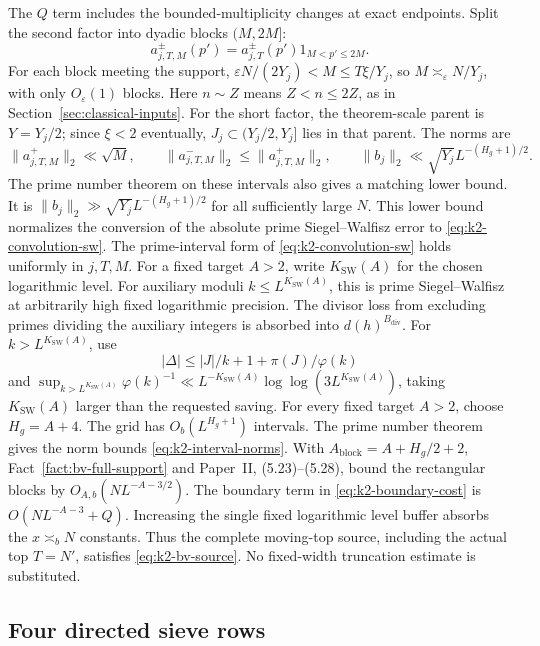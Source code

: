 The \(Q\) term includes the bounded-multiplicity changes at exact
endpoints. Split the second factor into dyadic blocks \((M,2M]\):
\[
 a_{j,T,M}^{\pm}(p')=a_{j,T}^{\pm}(p')1_{M<p'\le2M}.
\]
For each block meeting the support,
\(\varepsilon N/(2Y_j)<M\le T\xi/Y_j\), so
\(M\asymp_{\varepsilon}N/Y_j\), with only
\(O_{\varepsilon}(1)\) blocks. Here \(n\sim Z\) means
\(Z<n\le2Z\), as in Section~\ref{sec:classical-inputs}. For the short
factor, the theorem-scale parent is $Y=Y_j/2$; since $\xi<2$ eventually,
$J_j\subset(Y_j/2,Y_j]$ lies in that parent. The norms are
\begin{equation}\label{eq:k2-interval-norms}
 \|a_{j,T,M}^+\|_2\ll\sqrt M,\qquad
 \|a_{j,T,M}^-\|_2\le\|a_{j,T,M}^+\|_2,\qquad
 \|b_j\|_2\ll\sqrt{Y_j}L^{-(H_g+1)/2}.
\end{equation}
The prime number theorem on these intervals also gives a matching
lower bound. It is \(\|b_j\|_2\gg\sqrt{Y_j}L^{-(H_g+1)/2}\) for all sufficiently
large \(N\). This lower bound normalizes the conversion of the absolute
prime Siegel--Walfisz error to
\eqref{eq:k2-convolution-sw}.
The prime-interval form of \eqref{eq:k2-convolution-sw} holds uniformly
in \(j,T,M\). For a fixed target \(A>2\), write
\(K_{\mathrm{SW}}(A)\) for the
chosen logarithmic level. For auxiliary moduli \(k\le L^{K_{\mathrm{SW}}(A)}\), this is prime
Siegel--Walfisz at arbitrarily high fixed logarithmic precision.
The divisor loss from excluding primes dividing the auxiliary integers is
absorbed into \(d(h)^{B_{\mathrm{div}}}\). For \(k>L^{K_{\mathrm{SW}}(A)}\), use
\[
 |\Delta|\le |J|/k+1+\pi(J)/\varphi(k)
\]
and \(\sup_{k>L^{K_{\mathrm{SW}}(A)}}\varphi(k)^{-1}
\ll L^{-K_{\mathrm{SW}}(A)}\log\log(3L^{K_{\mathrm{SW}}(A)})\), taking
\(K_{\mathrm{SW}}(A)\) larger than the
requested saving. For every fixed target \(A>2\), choose
\(H_g=A+4\). The grid has \(O_b(L^{H_g+1})\) intervals. The prime
number theorem gives the norm bounds \eqref{eq:k2-interval-norms}.
With \(A_{\mathrm{block}}=A+H_g/2+2\), Fact~\ref{fact:bv-full-support}
and Paper~II, (5.23)--(5.28), bound the rectangular blocks by
\(O_{A,b}(NL^{-A-3/2})\). The boundary term in
\eqref{eq:k2-boundary-cost} is \(O(NL^{-A-3}+Q)\). Increasing the
single fixed logarithmic level buffer absorbs the \(x\asymp_b N\)
constants. Thus the complete moving-top source, including the
actual top \(T=N'\), satisfies \eqref{eq:k2-bv-source}. No fixed-width
truncation estimate is substituted.


\subsection{Four directed sieve rows}

